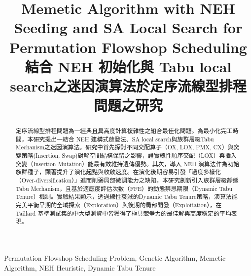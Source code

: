 \documentclass[conference]{IEEEtran}
\begin{document}
\title{Memetic Algorithm with NEH Seeding and SA Local Search for Permutation Flowshop Scheduling\\
{\large 結合 NEH 初始化與 Tabu local search之迷因演算法於定序流線型排程問題之研究}
}


\author{
\and
{}
}



\maketitle

\begin{abstract}
定序流線型排程問題為一經典且具高度計算複雜性之組合最佳化問題。為最小化完工時間，本研究提出一結合 NEH 建構式啟發法、SA local search與族群層級Tabu Mechanism之迷因演算法。研究中首先探討不同交配算子（OX, LOX, PMX, CX）與突變策略(Insertion, Swap)對解空間結構保留之影響，證實線性順序交配（LOX）與插入突變（Insertion Mutation）能最有效維持遺傳優勢。其次，導入 NEH 演算法作為初始族群種子，顯著提升了演化起點與收斂速度。在演化後期容易引發「過度多樣化（Over-diversification）」進而削弱局部微調能力之缺陷，本研究創新引入族群層級靜態Tabu Mechanism，且基於適應度評估次數（FFE）的動態禁忌期限（Dynamic Tabu Tenure）機制。實驗結果顯示，透過線性衰減的Dynamic Tabu Tenure策略，演算法能完美平衡早期的全域探索（Exploration）與後期的局部開發（Exploitation），在 Taillard 基準測試集的中大型測資中皆獲得了極具競爭力的最佳解與高度穩定的平均表現。
\end{abstract}

\begin{IEEEkeywords}
Permutation Flowshop Scheduling Problem, Genetic Algorithm, Memetic Algorithm, NEH Heuristic, Dynamic Tabu Tenure
\end{IEEEkeywords}
\end{document}
